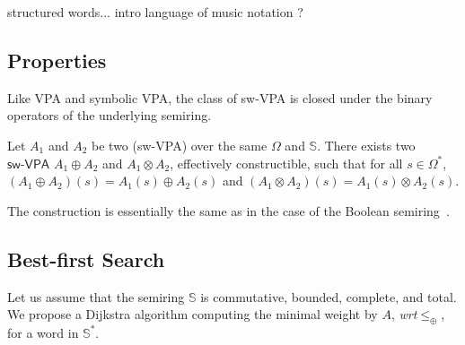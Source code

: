 \documentclass[runningheads]{llncs}
\def\wrt{\textit{wrt}\xspace}
\newcommand{\Semiring}{\mathbb{S}}
\def\SWVPA{\textsf{sw-VPA}\xspace}
\begin{document}
\begin{example}
structured words...
intro language of music notation ?
\end{example}


\subsection{Properties}
Like VPA and symbolic VPA, 
the class of \SWVPA is closed under the binary operators of the underlying semiring.
%
\begin{proposition}
Let $A_1$ and $A_2$ be two (\SWVPA)
over the same $\Omega$ and $\Semiring$.
There exists two $\SWVPA$ $A_1 \oplus A_2$ and $A_1 \otimes A_2$, 
effectively constructible, 
such that for all $s \in \Omega^*$, 
$(A_1 \oplus A_2)(s) = A_1(s) \oplus A_2(s)$ and 
$(A_1 \otimes A_2)(s) = A_1(s) \otimes A_2(s)$.
\end{proposition}
The construction is essentially the same 
as in the case of the Boolean semiring~\cite{dAntonyAlur14SVPDA}.


\subsection{Best-first Search}
Let us assume that the semiring $\Semiring$ is
commutative, bounded, complete, and total.
We propose a Dijkstra algorithm computing the minimal weight by $A$, 
\wrt $\leq_\oplus$, for a word in $\Semiring^*$.
\end{document}
